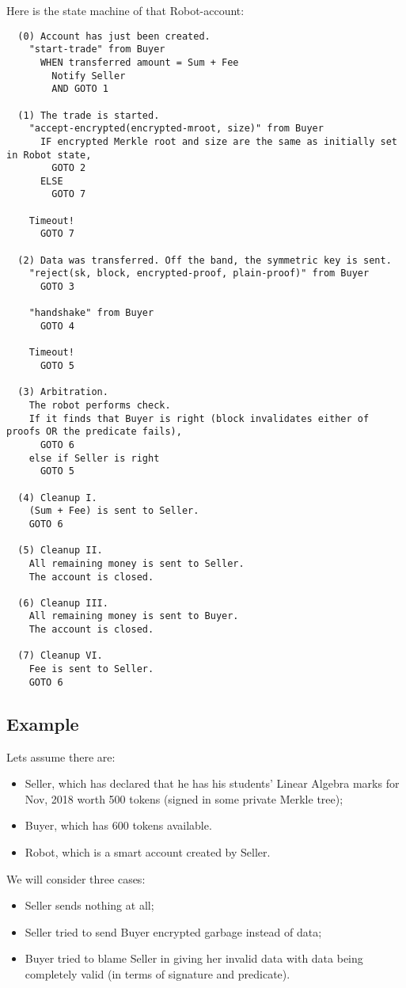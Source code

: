 Here is the state machine of that Robot-account:

\begin{verbatim}
  (0) Account has just been created.
    "start-trade" from Buyer
      WHEN transferred amount = Sum + Fee
        Notify Seller
        AND GOTO 1

  (1) The trade is started.
    "accept-encrypted(encrypted-mroot, size)" from Buyer
      IF encrypted Merkle root and size are the same as initially set in Robot state,
        GOTO 2
      ELSE
        GOTO 7

    Timeout!
      GOTO 7

  (2) Data was transferred. Off the band, the symmetric key is sent.
    "reject(sk, block, encrypted-proof, plain-proof)" from Buyer
      GOTO 3

    "handshake" from Buyer
      GOTO 4

    Timeout!
      GOTO 5

  (3) Arbitration.
    The robot performs check.
    If it finds that Buyer is right (block invalidates either of proofs OR the predicate fails),
      GOTO 6
    else if Seller is right
      GOTO 5

  (4) Cleanup I.
    (Sum + Fee) is sent to Seller.
    GOTO 6

  (5) Cleanup II.
    All remaining money is sent to Seller.
    The account is closed.

  (6) Cleanup III.
    All remaining money is sent to Buyer.
    The account is closed.

  (7) Cleanup VI.
    Fee is sent to Seller.
    GOTO 6

\end{verbatim}

\subsection{Example}

Lets assume there are:
\begin{itemize}
  \item Seller, which has declared that he has his students' Linear Algebra marks for Nov, 2018 worth 500 tokens (signed in some private Merkle tree);
  \item Buyer, which has 600 tokens available.
  \item Robot, which is a smart account created by Seller.
\end{itemize}

We will consider three cases:
\begin{itemize}
  \item Seller sends nothing at all;
  \item Seller tried to send Buyer encrypted garbage instead of data;
  \item Buyer tried to blame Seller in giving her invalid data with data being completely valid (in terms of signature and predicate).
\end{itemize}

